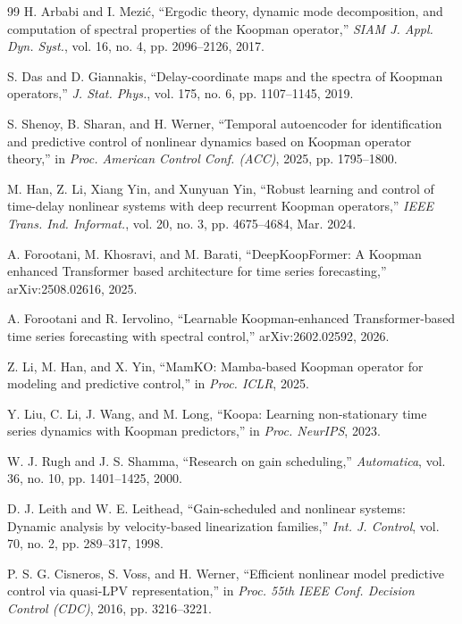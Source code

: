 \documentclass[journal]{IEEEtran}
\begin{document}
\begin{thebibliography}{99}
H. Arbabi and I. Mezi\'c, ``Ergodic theory, dynamic mode decomposition, and computation of spectral properties of the Koopman operator,'' \emph{SIAM J. Appl. Dyn. Syst.}, vol. 16, no. 4, pp. 2096--2126, 2017.

S. Das and D. Giannakis, ``Delay-coordinate maps and the spectra of Koopman operators,'' \emph{J. Stat. Phys.}, vol. 175, no. 6, pp. 1107--1145, 2019.

S. Shenoy, B. Sharan, and H. Werner, ``Temporal autoencoder for identification and predictive control of nonlinear dynamics based on Koopman operator theory,'' in \emph{Proc. American Control Conf. (ACC)}, 2025, pp. 1795--1800.

M. Han, Z. Li, Xiang Yin, and Xunyuan Yin, ``Robust learning and control of time-delay nonlinear systems with deep recurrent Koopman operators,'' \emph{IEEE Trans. Ind. Informat.}, vol. 20, no. 3, pp. 4675--4684, Mar. 2024.

A. Forootani, M. Khosravi, and M. Barati, ``DeepKoopFormer: A Koopman enhanced Transformer based architecture for time series forecasting,'' arXiv:2508.02616, 2025.

A. Forootani and R. Iervolino, ``Learnable Koopman-enhanced Transformer-based time series forecasting with spectral control,'' arXiv:2602.02592, 2026.

Z. Li, M. Han, and X. Yin, ``MamKO: Mamba-based Koopman operator for modeling and predictive control,'' in \emph{Proc. ICLR}, 2025.

Y. Liu, C. Li, J. Wang, and M. Long, ``Koopa: Learning non-stationary time series dynamics with Koopman predictors,'' in \emph{Proc. NeurIPS}, 2023.

W. J. Rugh and J. S. Shamma, ``Research on gain scheduling,'' \emph{Automatica}, vol. 36, no. 10, pp. 1401--1425, 2000.

D. J. Leith and W. E. Leithead, ``Gain-scheduled and nonlinear systems: Dynamic analysis by velocity-based linearization families,'' \emph{Int. J. Control}, vol. 70, no. 2, pp. 289--317, 1998.

P. S. G. Cisneros, S. Voss, and H. Werner, ``Efficient nonlinear model predictive control via quasi-LPV representation,'' in \emph{Proc. 55th IEEE Conf. Decision Control (CDC)}, 2016, pp. 3216--3221.


\end{thebibliography}
\end{document}
